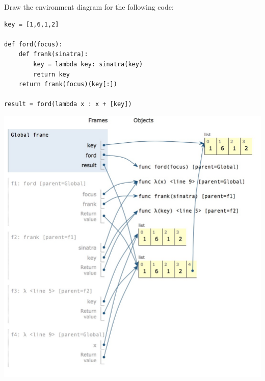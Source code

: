 \question Draw the environment diagram for the following code:
\begin{lstlisting}
key = [1,6,1,2]

def ford(focus):
    def frank(sinatra):
        key = lambda key: sinatra(key)
        return key
    return frank(focus)(key[:])

result = ford(lambda x : x + [key])
\end{lstlisting}

\begin{solution}[6in]
\begin{center}
\includegraphics[scale=.5]{env-vulf.png}
\end{center}
\end{solution}